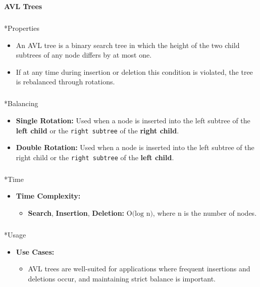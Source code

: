 \documentclass[
  letterpaper,
  DIV=11,
  numbers=noendperiod]{scrreprt}
\makeatletter
\let\oldsubparagraph\subparagraph
\renewcommand{\subparagraph}{
    \@ifstar
      \xxxSubParagraphStar
      \xxxSubParagraphNoStar
  }
\newcommand{\xxxSubParagraphStar}[1]{\oldsubparagraph*{#1}\mbox{}}
\newcommand{\xxxSubParagraphNoStar}[1]{\oldsubparagraph{#1}\mbox{}}
\providecommand{\tightlist}{%
  \setlength{\itemsep}{0pt}\setlength{\parskip}{0pt}}
\makeatother
\begin{document}
\begin{tcolorbox}[enhanced jigsaw, colframe=quarto-callout-note-color-frame, toprule=.15mm, bottomrule=.15mm, rightrule=.15mm, colback=white, breakable, arc=.35mm, opacityback=0, left=2mm, leftrule=.75mm]

\vspace{-3mm}\textbf{AVL Trees}\vspace{3mm}

\subparagraph*{Properties}\label{properties}

\begin{itemize}
\tightlist
\item
  An AVL tree is a binary search tree in which the height of the two
  child subtrees of any node differs by at most one.
\item
  If at any time during insertion or deletion this condition is
  violated, the tree is rebalanced through rotations.
\end{itemize}

\subparagraph*{Balancing}\label{balancing}

\begin{itemize}
\tightlist
\item
  \textbf{Single Rotation:} Used when a node is inserted into the left
  subtree of the \textbf{left child} or the \texttt{right\ subtree} of
  the \textbf{right child}.
\item
  \textbf{Double Rotation:} Used when a node is inserted into the left
  subtree of the right child or the \texttt{right\ subtree} of the
  \textbf{left child}.
\end{itemize}

\subparagraph*{Time}\label{time}

\begin{itemize}
\item
  \textbf{Time Complexity:}

  \begin{itemize}
  \tightlist
  \item
    \textbf{Search}, \textbf{Insertion}, \textbf{Deletion:}
    \(\text{O(log n)}\), where n is the number of nodes.
  \end{itemize}
\end{itemize}

\subparagraph*{Usage}\label{usage-24}

\begin{itemize}
\item
  \textbf{Use Cases:}

  \begin{itemize}
  \tightlist
  \item
    AVL trees are well-suited for applications where frequent insertions
    and deletions occur, and maintaining strict balance is important.
  \end{itemize}
\end{itemize}

\end{tcolorbox}
\end{document}
